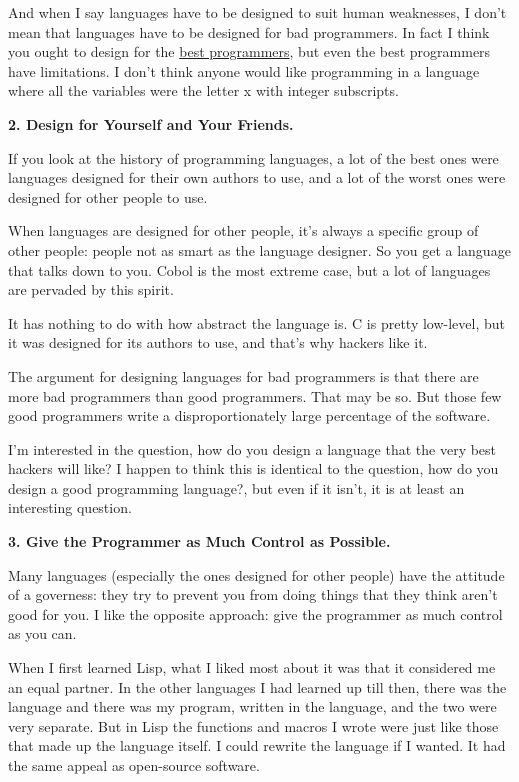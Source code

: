 \documentclass[12pt]{book}
\begin{document}
And when I say languages have to be designed to suit human weaknesses, I
don't mean that languages have to be designed for bad programmers. In
fact I think you ought to design for the \href{design.html}{best
programmers}, but even the best programmers have limitations. I don't
think anyone would like programming in a language where all the
variables were the letter x with integer subscripts.

\textbf{2. Design for Yourself and Your Friends.}

If you look at the history of programming languages, a lot of the best
ones were languages designed for their own authors to use, and a lot of
the worst ones were designed for other people to use.

When languages are designed for other people, it's always a specific
group of other people: people not as smart as the language designer. So
you get a language that talks down to you. Cobol is the most extreme
case, but a lot of languages are pervaded by this spirit.

It has nothing to do with how abstract the language is. C is pretty
low-level, but it was designed for its authors to use, and that's why
hackers like it.

The argument for designing languages for bad programmers is that there
are more bad programmers than good programmers. That may be so. But
those few good programmers write a disproportionately large percentage
of the software.

I'm interested in the question, how do you design a language that the
very best hackers will like? I happen to think this is identical to the
question, how do you design a good programming language?, but even if it
isn't, it is at least an interesting question.

\textbf{3. Give the Programmer as Much Control as Possible.}

Many languages (especially the ones designed for other people) have the
attitude of a governess: they try to prevent you from doing things that
they think aren't good for you. I like the opposite approach: give the
programmer as much control as you can.

When I first learned Lisp, what I liked most about it was that it
considered me an equal partner. In the other languages I had learned up
till then, there was the language and there was my program, written in
the language, and the two were very separate. But in Lisp the functions
and macros I wrote were just like those that made up the language
itself. I could rewrite the language if I wanted. It had the same appeal
as open-source software.
\end{document}
